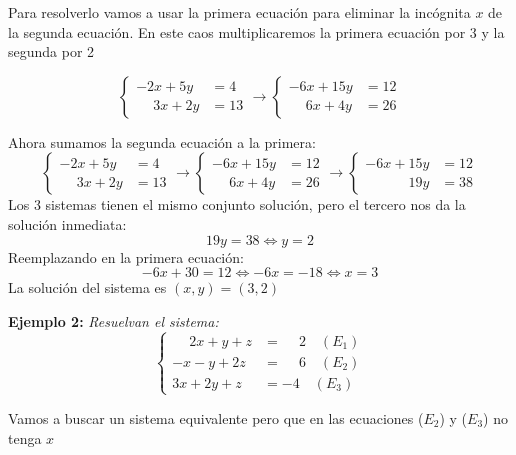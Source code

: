 Para resolverlo vamos a usar la primera ecuación para eliminar la incógnita $x$ de la segunda ecuación. En este caos multiplicaremos la primera ecuación por 3 y la segunda por 2

$$
\begin{cases}
        -2x + 5y &= 4\\
        \phantom{-}3x + 2y &= 13
\end{cases}
\rightarrow
\begin{cases}
-6x + 15y & = 12 \\
\phantom{-}6x + 4y & = 26
\end{cases}
$$

Ahora sumamos la segunda ecuación a la primera:
$$
\begin{cases}
        -2x + 5y &= 4\\
        \phantom{-}3x + 2y &= 13
\end{cases}
\rightarrow
\begin{cases}
-6x + 15y & = 12 \\
\phantom{-}6x + 4y & = 26
\end{cases}
\rightarrow
\begin{cases}
-6x + 15y & = 12 \\
\phantom{-6x + }19y & = 38
\end{cases}
$$
Los 3 sistemas tienen el mismo conjunto solución, pero el tercero nos da la solución inmediata:
$$
19y = 38 \Leftrightarrow y = 2
$$
Reemplazando en la primera ecuación:
$$
-6x + 30 = 12 \Leftrightarrow -6x = -18 \Leftrightarrow x = 3
$$
La solución del sistema es $(x, y) = (3, 2)$

\noindent \textbf{Ejemplo 2:} \emph{Resuelvan el sistema:}
$$
\begin{cases}
        \phantom{-}2x + y + z &= \phantom{-}2 \quad (E_1)\\
        -x - y + 2z &= \phantom{-}6 \quad  (E_2)\\
        3x + 2y + z &= -4 \quad  (E_3)
\end{cases}
$$

Vamos a buscar un sistema equivalente pero que en las ecuaciones ($E_2$) y ($E_3$) no tenga $x$

